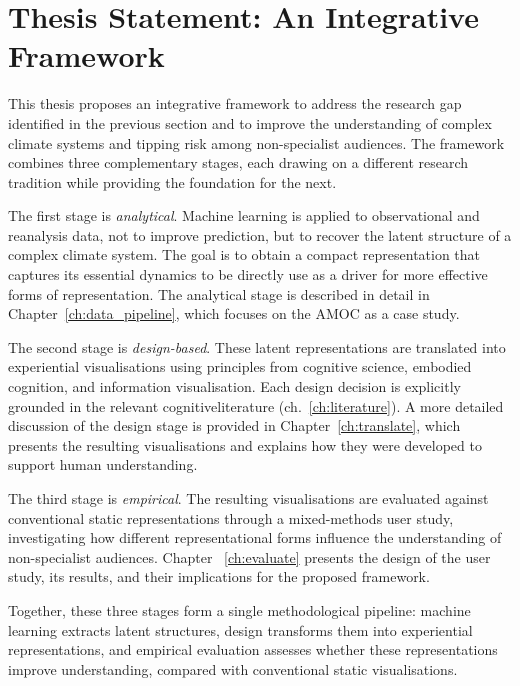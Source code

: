 \section{Thesis Statement: An Integrative Framework}
\label{sec:proposal}

This thesis proposes an integrative framework to address the research gap identified in the previous section and to improve the understanding of complex climate systems and tipping risk among non-specialist audiences. The framework combines three complementary stages, each drawing on a different research tradition while providing the foundation for the next.

The first stage is \emph{analytical}. Machine learning is applied to observational and reanalysis data, not to improve prediction, but to recover the latent structure of a complex climate system. The goal is to obtain a compact representation that captures its essential dynamics to be directly use as a driver for more effective forms of representation. The analytical stage is described in detail in Chapter~\ref{ch:data_pipeline}, which focuses on the AMOC as a case study.

The second stage is \emph{design-based}. These latent representations are translated into experiential visualisations using principles from cognitive science, embodied cognition, and information visualisation. Each design decision is explicitly grounded in the relevant cognitiveliterature (ch.~\ref{ch:literature}). A more detailed discussion of the design stage is provided in Chapter~\ref{ch:translate}, which presents the resulting visualisations and explains how they were developed to support human understanding.

The third stage is \emph{empirical}. The resulting visualisations are evaluated against conventional static representations through a mixed-methods user study, investigating how different representational forms influence the understanding of non-specialist audiences. Chapter ~\ref{ch:evaluate} presents the design of the user study, its results, and their implications for the proposed framework.

Together, these three stages form a single methodological pipeline: machine learning extracts latent structures, design transforms them into experiential representations, and empirical evaluation assesses whether these representations improve understanding, compared with conventional static visualisations. 

